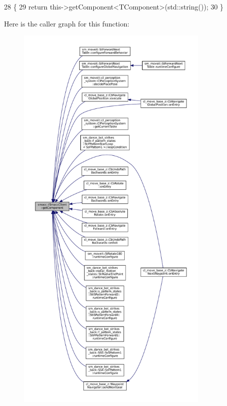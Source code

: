 \begin{DoxyCode}
28 \{
29     \textcolor{keywordflow}{return} this->getComponent<TComponent>(std::string());
30 \}
\end{DoxyCode}
Here is the caller graph for this function\+:
\nopagebreak
\begin{figure}[H]
\begin{center}
\leavevmode
\includegraphics[height=550pt]{classsmacc_1_1ISmaccClient_adef78db601749ca63c19e74a27cb88cc_icgraph}
\end{center}
\end{figure}
\mbox{\label{classsmacc_1_1ISmaccClient_ad72cba3ce7c5b3bd3977747dc6d5fb69}} 
